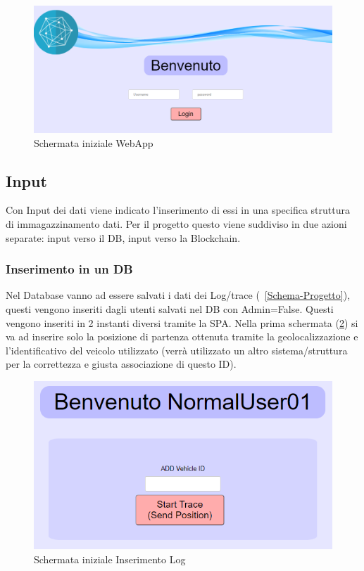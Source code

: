 \documentclass[11pt,a4paper,titlepage, twoside, openright]{report}
\begin{document}
\begin{figure}[h]
	\includegraphics[width=\textwidth]{HomePage}
	\centering
	\caption{Schermata iniziale WebApp}
	\label{fig:HomePage}
\end{figure}

\subsection{Input}
Con Input dei dati viene indicato l'inserimento di essi in una specifica struttura di immagazzinamento dati. Per il progetto questo viene suddiviso in due azioni separate: input verso il DB, input verso la Blockchain.
\subsubsection{Inserimento in un DB}
Nel Database vanno ad essere salvati i dati dei Log/trace (~\ref{Schema-Progetto}), questi vengono inseriti dagli utenti salvati nel DB con Admin=False. Questi vengono inseriti in 2 instanti diversi tramite la SPA.
Nella prima schermata (\ref{fig:Init_Log}) si va ad inserire solo la posizione di partenza ottenuta tramite la geolocalizzazione e l'identificativo del veicolo utilizzato (verrà utilizzato un altro sistema/struttura per la correttezza e giusta associazione di questo ID).

\begin{figure}[h]
	\includegraphics[width=\textwidth]{Init_Log}
	\centering
	\caption{Schermata iniziale Inserimento Log}
	\label{fig:Init_Log}
\end{figure}
\end{document}

